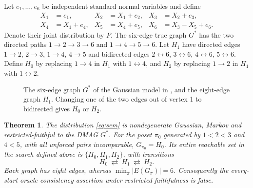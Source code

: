 \documentclass[11pt]{article}
\newtheorem{theorem}{Theorem}
\newcommand{\bidir}{\leftrightarrow}
\begin{document}
Let $e_1,\ldots,e_6$ be independent standard normal variables and define
\begin{equation}\label{eq:sem}
\begin{aligned}
X_1&=e_1,&X_2&=X_1+e_2,&X_3&=X_2+e_3,\\
X_4&=X_1+e_4,&X_5&=X_4+e_5,&X_6&=X_3-X_5+e_6.
\end{aligned}
\end{equation}
Denote their joint distribution by $P$. The six-edge true graph $G^*$ has
the two directed paths $1\to2\to3\to6$ and $1\to4\to5\to6$.
Let $H_1$ have directed edges $1\to2$, $2\to3$, $1\to4$, $4\to5$ and
bidirected edges $2\bidir6$, $3\bidir6$, $4\bidir6$, $5\bidir6$.
Define $H_0$ by replacing $1\to4$ in $H_1$ with $1\bidir4$, and $H_2$
by replacing $1\to2$ in $H_1$ with $1\bidir2$.

\begin{figure}[ht]
\centering
{}
\caption{The six-edge graph $G^*$ of the Gaussian model in
\cite[Figure 1]{BS20}, and the eight-edge graph $H_1$.
Changing one of the two edges out of vertex 1 to bidirected gives $H_0$ or $H_2$.}
\label{fig:graphs}
\end{figure}

\noindent\begin{minipage}{\textwidth}
\begin{theorem}\label{thm:main}
The distribution \eqref{eq:sem} is nondegenerate Gaussian, Markov and
restricted-faithful to the DMAG $G^*$. For the poset $\pi_0$ generated by
$1<2<3$ and $4<5$, with all unforced pairs incomparable,
$G_{\pi_0}=H_0$. Its entire reachable set in the search defined above is
$\{H_0,H_1,H_2\}$, with transitions
\begin{equation}\label{eq:component}
H_0\ \rightleftarrows\ H_1\ \rightleftarrows\ H_2.
\end{equation}
Each graph has eight edges, whereas $\min_\pi |E(G_\pi)|=6$.
Consequently the every-start oracle consistency assertion under restricted
faithfulness is false.
\end{theorem}
\end{minipage}
\end{document}
